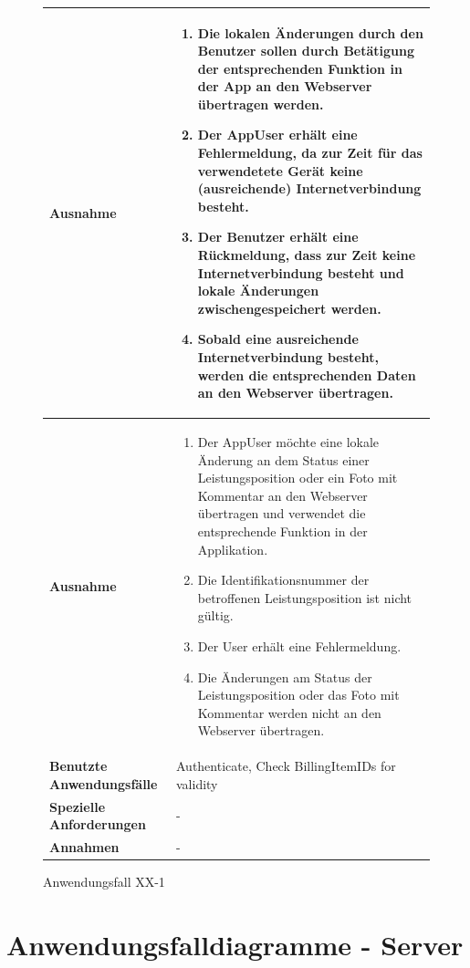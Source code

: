 			\begin{figure}[h]
	\centering
	\begin{tabularx}{\textwidth}{ X | X }
					 	\textbf{Ausnahme} &
				\begin{enumerate}
					\item Die lokalen \"Anderungen durch den Benutzer sollen durch Bet\"atigung der entsprechenden Funktion in der App an den Webserver \"ubertragen werden.
					\item Der AppUser erh\"alt eine Fehlermeldung,  da zur Zeit f\"ur das verwendetete Ger\"at keine (ausreichende) Internetverbindung besteht. 
					\item Der Benutzer erh\"alt eine R\"uckmeldung,  dass zur Zeit keine Internetverbindung besteht und lokale \"Anderungen zwischengespeichert werden.
					\item Sobald eine ausreichende Internetverbindung besteht,  werden die entsprechenden Daten an den Webserver \"ubertragen.
				\end{enumerate} \\ \hline
						\textbf{Ausnahme} &
				\begin{enumerate}
					 \item Der AppUser m\"ochte eine lokale \"Anderung an dem Status einer Leistungsposition oder ein Foto mit Kommentar an den Webserver \"ubertragen und verwendet die entsprechende Funktion in der Applikation. 
					 \item Die Identifikationsnummer der betroffenen Leistungsposition ist nicht g\"ultig.
					 \item Der User erh\"alt eine Fehlermeldung.
					 \item Die \"Anderungen am Status der Leistungsposition oder das Foto mit Kommentar werden nicht an den Webserver \"ubertragen.
				\end{enumerate} \\ \hline
		\textbf{Benutzte Anwendungsfälle} & Authenticate,  Check BillingItemIDs for validity\\ \hline
		\textbf{Spezielle Anforderungen} & - \\ \hline
		\textbf{Annahmen} & -
	\end{tabularx}
	\caption{Anwendungsfall XX-1}
	\label{fig:anwendungsfall-app-tabelle-xx-4}
\end{figure}

\clearpage

\section{Anwendungsfalldiagramme - Server}

